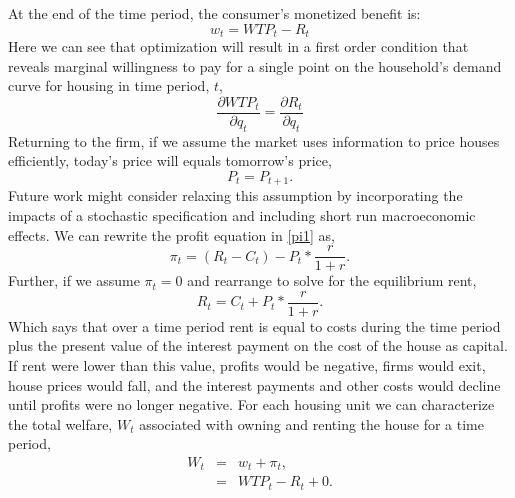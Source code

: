 \documentclass[ecta,nameyear,draft]{econsocart}
\theoremstyle{plain}
\theoremstyle{remark}
\begin{document}
At the end of the time period, the consumer’s monetized benefit is:
\begin{equation*}
	 w_t=\mathit{WTP}_t-R_t
\end{equation*}
Here we can see that optimization will result in a first order condition that reveals marginal willingness
to pay for a single point on the household’s demand curve for housing in time period, $t$,
\begin{equation}
	\frac{\partial \mathit{WTP}_t}{\partial q_t}=\frac{\partial R_t}{\partial q_t} \label{foc}
\end{equation}
Returning to  	the firm, if we assume the market uses information to price houses efficiently, today’s price will equals tomorrow’s
price,
\begin{equation*}
	P_t=P_{t+1}.
\end{equation*}
Future work might consider relaxing this assumption by incorporating the impacts of a stochastic
specification and including short run macroeconomic effects.
We can rewrite the profit equation in \ref{pi1} as,
\begin{equation}
	\pi_t=(R_t-C_t)-P_t*\frac{r}{1+r}.\label{pi1.1}
\end{equation}
Further, if we assume $\pi_t=0$ and rearrange to solve for the equilibrium rent,
\begin{equation}
	R_t=C_t+P_t*\frac{r}{1+r}.\label{rent1}
\end{equation}
Which says that over a time period rent is equal to costs during the time period plus the present value of
the interest payment on the cost of the house as capital. If rent were lower than this value, profits
would be negative, firms would exit, house prices would fall, and the interest payments and other costs
would decline until profits were no longer negative.
For each housing unit we can characterize the total welfare, $W_t$ associated with owning and renting the house for a time period,
\begin{eqnarray*}
	W_t & = & w_t+\pi_t,\\
	& = & \mathit{WTP}_t-R_t+0.
\end{eqnarray*}
\end{document}
